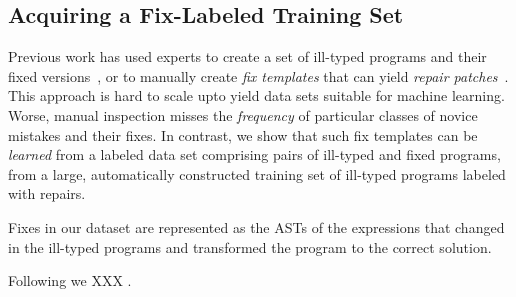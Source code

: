 

\subsection{Acquiring a Fix-Labeled Training Set}
\label{sec:overview:data}

Previous work has used experts to create a set of ill-typed programs 
and their fixed versions~\citep[][]{Lerner2007-dt, Loncaric2016-uk},
or to manually create \emph{fix templates} that can yield 
\emph{repair patches}~\citep[][]{martinez2013automatically,martinez2015mining}.
%
This approach is hard to scale upto yield data sets suitable for 
machine learning. Worse, manual inspection misses the \emph{frequency} 
of particular classes of novice mistakes and their fixes.
%
In contrast, we show that such fix templates can be 
\emph{learned} from a labeled data set comprising pairs 
of ill-typed and fixed programs, from a large, automatically 
constructed training set of ill-typed programs labeled with repairs.

Fixes in our dataset are represented as the ASTs of 
the expressions that changed in the ill-typed programs 
and transformed the program to the correct solution.

%
Following \citep{Seidel:2017} we XXX .
%

